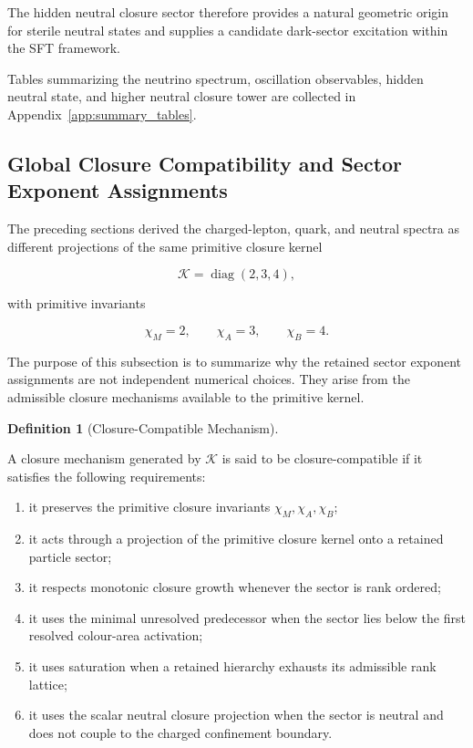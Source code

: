 \documentclass[11pt]{article}
\theoremstyle{definition}
\newtheorem{definition}[theorem]{Definition}
\theoremstyle{remark}
\begin{document}
The hidden neutral closure sector therefore provides a natural
geometric origin for sterile neutral states and supplies a
candidate dark-sector excitation within the SFT framework.


Tables summarizing the neutrino spectrum, oscillation
observables, hidden neutral state, and higher neutral closure
tower are collected in
Appendix~\ref{app:summary_tables}.


\subsection{Global Closure Compatibility and Sector Exponent Assignments}
\label{subsec:global_closure_admissibility}

The preceding sections derived the charged-lepton, quark, and
neutral spectra as different projections of the same primitive
closure kernel

\begin{equation}
\mathcal K
=
\operatorname{diag}(2,3,4),
\end{equation}

with primitive invariants

\begin{equation}
\chi_M=2,
\qquad
\chi_A=3,
\qquad
\chi_B=4.
\end{equation}

The purpose of this subsection is to summarize why the retained
sector exponent assignments are not independent numerical
choices. They arise from the admissible closure mechanisms
available to the primitive kernel.

\begin{definition}[Closure-Compatible Mechanism]
\label{def:closure_compatible_mechanism}

A closure mechanism generated by \(\mathcal K\) is said to be
closure-compatible if it satisfies the following requirements:

\begin{enumerate}
\item it preserves the primitive closure invariants
\(\chi_M,\chi_A,\chi_B\);
\item it acts through a projection of the primitive closure
kernel onto a retained particle sector;
\item it respects monotonic closure growth whenever the sector
is rank ordered;
\item it uses the minimal unresolved predecessor when the sector
lies below the first resolved colour-area activation;
\item it uses saturation when a retained hierarchy exhausts its
admissible rank lattice;
\item it uses the scalar neutral closure projection when the
sector is neutral and does not couple to the charged
confinement boundary.
\end{enumerate}

\end{definition}
\end{document}

